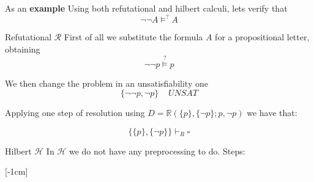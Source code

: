 \begin{example}
As an \textbf{example} Using both refutational and hilbert calculi, lets verify that
$$ \neg \neg A \models^? A $$

\begin{mybox}{Refutational $\mathcal{R}$}
First of all we substitute the formula $A$ for a propositional letter, obtaining
$$ \neg \neg p \overset{?}{\vDash} p $$

We then change the problem in an unsatisfiability one
$$ \{\neg \neg p, \neg p\} \;\;\;\; UNSAT$$

Applying one step of resolution using $D = \mathbb{R} (\{p\}, \{\neg p\}; p, \neg p)$ we have that:

$$ \{\{p\}, \{\neg p\}\} \vdash_R \square $$
\end{mybox}

%

\begin{mybox}{Hilbert $\mathcal{H}$}
In $\mathcal{H}$ we do not have any preprocessing to do. Steps: \\

\end{mybox}

\end{example}   [-1cm]

\vspace{-0.3cm}

